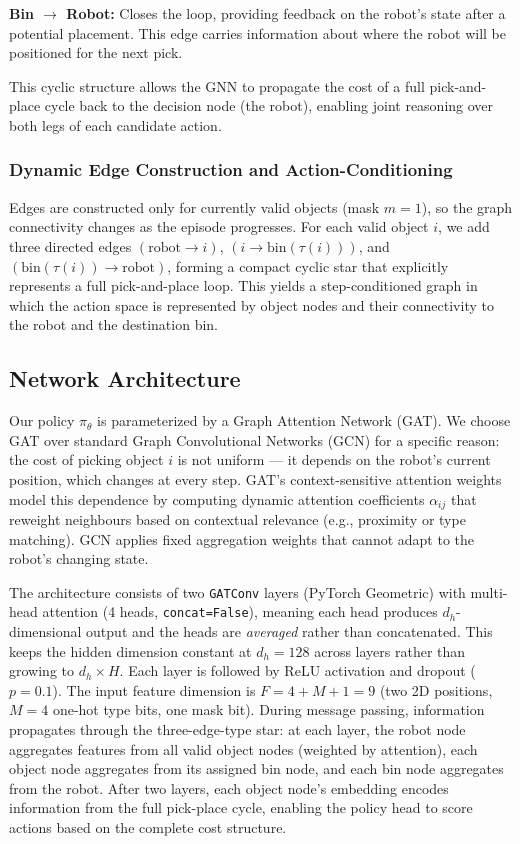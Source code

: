 \documentclass[conference]{IEEEtran}
\begin{document}
\textbf{Bin $\to$ Robot:} Closes the loop, providing feedback on the robot's state after a potential placement. This edge carries information about where the robot will be positioned for the next pick.

This cyclic structure allows the GNN to propagate the cost of a full pick-and-place cycle back to the decision node (the robot), enabling joint reasoning over both legs of each candidate action.

\subsubsection{Dynamic Edge Construction and Action-Conditioning}
Edges are constructed only for currently valid objects (mask $m=1$), so the graph connectivity changes as the episode progresses.
For each valid object $i$, we add three directed edges $(\text{robot}\rightarrow i)$, $(i \rightarrow \text{bin}(\tau(i)))$, and $(\text{bin}(\tau(i)) \rightarrow \text{robot})$, forming a compact cyclic star that explicitly represents a full pick-and-place loop.
This yields a step-conditioned graph in which the action space is represented by object nodes and their connectivity to the robot and the destination bin.

\subsection{Network Architecture}
Our policy $\pi_\theta$ is parameterized by a Graph Attention Network (GAT). We choose GAT over standard Graph Convolutional Networks (GCN) for a specific reason: the cost of picking object $i$ is not uniform --- it depends on the robot's current position, which changes at every step. GAT's context-sensitive attention weights model this dependence by computing dynamic attention coefficients $\alpha_{ij}$ that reweight neighbours based on contextual relevance (e.g., proximity or type matching). GCN applies fixed aggregation weights that cannot adapt to the robot's changing state.

The architecture consists of two \texttt{GATConv} layers (PyTorch Geometric) with multi-head attention (4 heads, \texttt{concat=False}), meaning each head produces $d_h$-dimensional output and the heads are \emph{averaged} rather than concatenated. This keeps the hidden dimension constant at $d_h{=}128$ across layers rather than growing to $d_h \times H$. Each layer is followed by ReLU activation and dropout ($p=0.1$). The input feature dimension is $F{=}4 + M + 1 = 9$ (two 2D positions, $M{=}4$ one-hot type bits, one mask bit). During message passing, information propagates through the three-edge-type star: at each layer, the robot node aggregates features from all valid object nodes (weighted by attention), each object node aggregates from its assigned bin node, and each bin node aggregates from the robot. After two layers, each object node's embedding encodes information from the full pick-place cycle, enabling the policy head to score actions based on the complete cost structure.
\end{document}
